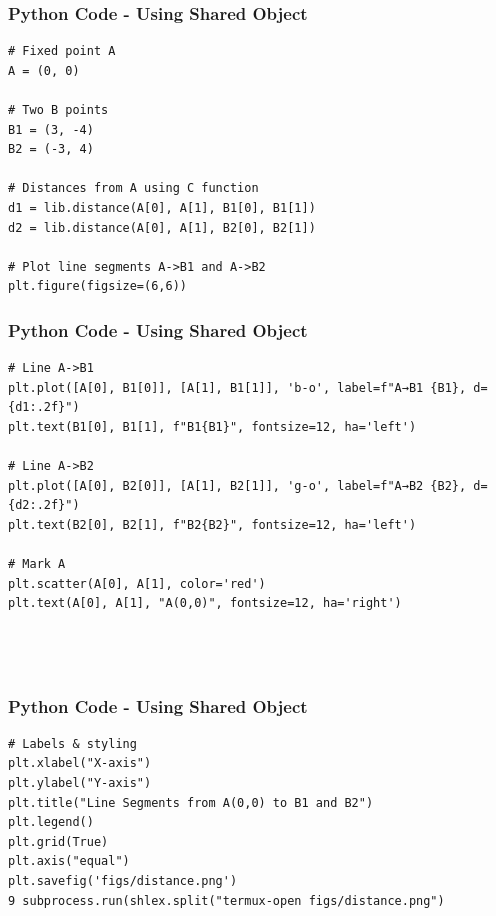 \documentclass{beamer}
\begin{document}
\begin{frame}[fragile]
    \frametitle{Python Code - Using Shared Object}
    \begin{lstlisting}
# Fixed point A
A = (0, 0)

# Two B points
B1 = (3, -4)
B2 = (-3, 4)

# Distances from A using C function
d1 = lib.distance(A[0], A[1], B1[0], B1[1])
d2 = lib.distance(A[0], A[1], B2[0], B2[1])

# Plot line segments A->B1 and A->B2
plt.figure(figsize=(6,6))

\end{lstlisting}
\end{frame}
\begin{frame}[fragile]
    \frametitle{Python Code - Using Shared Object}
    \begin{lstlisting}
# Line A->B1
plt.plot([A[0], B1[0]], [A[1], B1[1]], 'b-o', label=f"A→B1 {B1}, d={d1:.2f}")
plt.text(B1[0], B1[1], f"B1{B1}", fontsize=12, ha='left')

# Line A->B2
plt.plot([A[0], B2[0]], [A[1], B2[1]], 'g-o', label=f"A→B2 {B2}, d={d2:.2f}")
plt.text(B2[0], B2[1], f"B2{B2}", fontsize=12, ha='left')

# Mark A
plt.scatter(A[0], A[1], color='red')
plt.text(A[0], A[1], "A(0,0)", fontsize=12, ha='right')




\end{lstlisting}
\end{frame}
\begin{frame}[fragile]
    \frametitle{Python Code - Using Shared Object}
    \begin{lstlisting}
# Labels & styling
plt.xlabel("X-axis")
plt.ylabel("Y-axis")
plt.title("Line Segments from A(0,0) to B1 and B2")
plt.legend()
plt.grid(True)
plt.axis("equal")
plt.savefig('figs/distance.png')
9 subprocess.run(shlex.split("termux-open figs/distance.png")
\end{lstlisting}
\end{frame}
\end{document}
